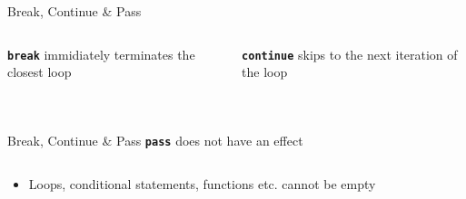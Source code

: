         \begin{frame}{Break, Continue \& Pass}
            \begin{columns}
                \begin{column}{0.5\textwidth}
                    \textbf{\texttt{break}} immidiately terminates the closest loop
                    \bigskip  
                    \inputminted[frame=single,framesep=2pt]{python3}{code-examples/break1.py}
                    \pause
                    \inputminted[frame=single,framesep=2pt]{python3}{code-examples/break2.py}
                \end{column}
               \pause 
                \begin{column}{0.5\textwidth}
                    \textbf{\texttt{continue}} skips to the next iteration of the loop
                    \bigskip  
                    \inputminted[frame=single,framesep=2pt]{python3}{code-examples/continue1.py}
                    \pause
                    \inputminted[frame=single,framesep=2pt]{python3}{code-examples/continue2.py}
                \end{column} 
            \end{columns}
        \end{frame}
        
        \begin{frame}{Break, Continue \& Pass}
            \pause
            \LARGE
            \textbf{\texttt{pass}} does not have an effect
            \bigskip  
            \inputminted[frame=single,framesep=2pt]{python3}{code-examples/pass.py}
            \pause
            \begin{itemize}
                \item Loops, conditional statements, functions etc. cannot be empty 
            \end{itemize}
        \end{frame}

